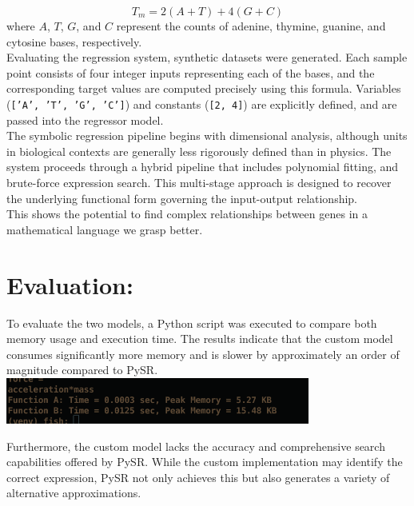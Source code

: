 \documentclass{article}
\begin{document}
\begin{equation}
    T_m = 2(A + T) + 4(G + C)
\end{equation}
where $A$, $T$, $G$, and $C$ represent the counts of adenine, thymine, guanine, and cytosine bases, respectively.\\


Evaluating the regression system, synthetic datasets were generated. Each sample point consists of four integer inputs representing each of the bases, and the corresponding target values are computed precisely using this formula. Variables (\texttt{['A', 'T', 'G', 'C']}) and constants (\texttt{[2, 4]}) are explicitly defined, and are passed into the regressor model.\\

The symbolic regression pipeline begins with dimensional analysis, although units in biological contexts are generally less rigorously defined than in physics. The system proceeds through a hybrid pipeline that includes polynomial fitting, and brute-force expression search. This multi-stage approach is designed to recover the underlying functional form governing the input-output relationship.\\

This shows the potential to find complex relationships between genes in a mathematical language we grasp better. \\



\section{Evaluation:}

To evaluate the two models, a Python script was executed to compare both memory usage and execution time. The results indicate that the custom model consumes significantly more memory and is slower by approximately an order of magnitude compared to PySR.\\

\includegraphics[width=10cm]{Eval_2}

Furthermore, the custom model lacks the accuracy and comprehensive search capabilities offered by PySR. While the custom implementation may identify the correct expression, PySR not only achieves this but also generates a variety of alternative approximations.\
\end{document}
